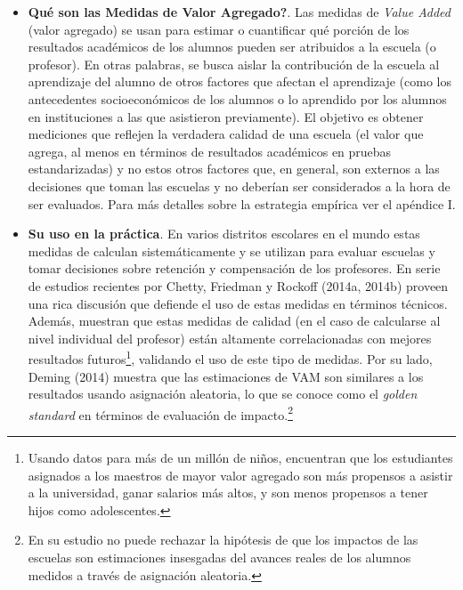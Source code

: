 \documentclass[11pt]{article}
\numberwithin{equation}{section}
\begin{document}
\begin{itemize}
\item {\bf \textquestiondown Qu\'e son las Medidas de Valor Agregado?}. Las medidas de {\it Value Added} (valor agregado) se usan para estimar o cuantificar qu\'e porci\'on de los resultados acad\'emicos de los alumnos pueden ser atribuidos a la escuela (o profesor). En otras palabras, se busca aislar la contribuci\'on de la escuela al aprendizaje del alumno de otros factores que afectan el aprendizaje (como los antecedentes socioecon\'omicos de los alumnos o lo aprendido por los alumnos en instituciones a las que asistieron previamente). El objetivo es obtener mediciones que reflejen la verdadera calidad de una escuela (el valor que agrega, al menos en t\'erminos de resultados acad\'emicos en pruebas estandarizadas) y no estos otros factores que, en general, son externos a las decisiones que toman las escuelas y no deber\'ian ser considerados a la hora de ser evaluados. Para m\'as detalles sobre la estrategia emp\'irica ver el ap\'endice I.


\item {\bf Su uso en la pr\'actica}. En varios distritos escolares en el mundo estas medidas de calculan sistem\'aticamente y se utilizan para evaluar escuelas y tomar decisiones sobre retenci\'on y compensaci\'on de los profesores. En serie de estudios recientes por Chetty, Friedman y Rockoff (2014a, 2014b) proveen una rica discusi\'on que defiende el uso de estas medidas en t\'erminos t\'ecnicos. Adem\'as, muestran que estas medidas de calidad (en el caso de calcularse al nivel individual del profesor) est\'an altamente correlacionadas con mejores resultados futuros\footnote{Usando datos para m\'as de un mill\'on de ni\~nos, encuentran que los estudiantes asignados a los maestros de mayor valor agregado son m\'as propensos a asistir a la universidad, ganar salarios m\'as altos, y son menos propensos a tener hijos como adolescentes.}, validando el uso de este tipo de medidas. Por su lado, Deming (2014) muestra que las estimaciones de VAM son similares a los resultados usando asignaci\'on aleatoria, lo que se conoce como el {\it golden standard} en t\'erminos de evaluaci\'on de impacto.\footnote{En su estudio no puede rechazar la hip\'otesis de que los impactos de las escuelas son estimaciones insesgadas del avances reales de los alumnos medidos a trav\'es de asignaci\'on aleatoria.}



\end{itemize}
\end{document}
